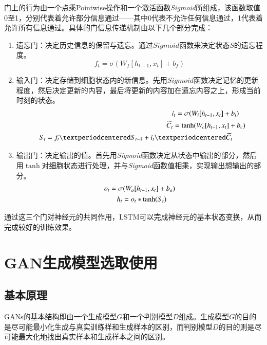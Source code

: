 门上的行为由一个点乘Pointwise操作和一个激活函数\textit{Sigmoid}所组成，该函数取值0至1，分别代表着允许部分信息通过——其中0代表不允许任何信息通过，1代表着允许所有信息通过。具体的门信息传递机制由以下几个部分完成：
\begin{enumerate}[fullwidth,itemindent=2em,label=\arabic*.]
  \item 遗忘门：决定历史信息的保留与遗忘。通过$Sigmoid$函数来决定状态$S$的遗忘程度。
  \begin{equation}
    f_t=\sigma(W_f[h_{t-1}, x_t]+b_f)
    \label{forget}
  \end{equation}
  \item 输入门：决定存储到细胞状态内的新信息。先用$Sigmoid$函数决定记忆的更新程度，然后决定更新的内容，最后将更新的内容加在遗忘内容之上，形成当前时刻的状态。
  \begin{equation}
    \begin{split}
      i_t=\sigma(W_i[h_{t-1}, x_t]+b_i)\hspace{0.2em}\\
      \widetilde{C_t}=\tanh(W_c[h_{t-1}, x_t]+b_c)\hspace{-0.7em}\\
      S_t = f_t·S_{t-1} + i_t · \widetilde{C_t}\hspace{1.1em}
    \end{split}
    \label{input}
  \end{equation}
  \item 输出门：决定输出的值。首先用\textit{Sigmoid}函数决定从状态中输出的部分，然后用$\tanh$对细胞状态进行处理，并与\textit{Sigmoid}函数值相乘，实现输出想输出的部分。
  \begin{equation}
    \begin{split}
      o_t = \sigma(W_o[h_{t-1}, x_t] + b_o)\\
      h_t = o_t*\tanh(S_t)\hspace{1.2em}
    \end{split}
    \label{output}
  \end{equation}
\end{enumerate}

通过这三个门对神经元的共同作用，LSTM可以完成神经元的基本状态变换，从而完成较好的训练效果。

\section{GAN生成模型选取使用}

\subsection{基本原理}
GANs的基本结构即由一个生成模型$G$和一个判别模型$D$组成。生成模型$G$的目的是尽可能最小化生成与真实训练样和生成样本的区别，而判别模型$D$的目的则是尽可能最大化地找出真实样本和生成样本之间的区别。


